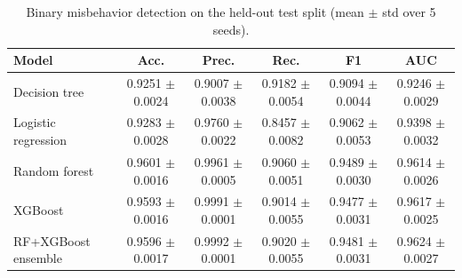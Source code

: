 \begin{table}[!t]
\renewcommand{\arraystretch}{1.15}
\caption{Binary misbehavior detection on the held-out test split (mean $\pm$ std over 5 seeds).}
\label{tab:ids}
\centering
\footnotesize
\setlength{\tabcolsep}{6pt}
\begin{tabular}{@{}lccccc@{}}
\toprule
\textbf{Model} & \textbf{Acc.} & \textbf{Prec.} & \textbf{Rec.} & \textbf{F1} & \textbf{AUC} \\
\midrule
Decision tree & 0.9251 $\pm$ 0.0024 & 0.9007 $\pm$ 0.0038 & 0.9182 $\pm$ 0.0054 & 0.9094 $\pm$ 0.0044 & 0.9246 $\pm$ 0.0029 \\
Logistic regression & 0.9283 $\pm$ 0.0028 & 0.9760 $\pm$ 0.0022 & 0.8457 $\pm$ 0.0082 & 0.9062 $\pm$ 0.0053 & 0.9398 $\pm$ 0.0032 \\
Random forest & 0.9601 $\pm$ 0.0016 & 0.9961 $\pm$ 0.0005 & 0.9060 $\pm$ 0.0051 & 0.9489 $\pm$ 0.0030 & 0.9614 $\pm$ 0.0026 \\
XGBoost & 0.9593 $\pm$ 0.0016 & 0.9991 $\pm$ 0.0001 & 0.9014 $\pm$ 0.0055 & 0.9477 $\pm$ 0.0031 & 0.9617 $\pm$ 0.0025 \\
RF+XGBoost ensemble & 0.9596 $\pm$ 0.0017 & 0.9992 $\pm$ 0.0001 & 0.9020 $\pm$ 0.0055 & 0.9481 $\pm$ 0.0031 & 0.9624 $\pm$ 0.0027 \\
\bottomrule
\end{tabular}
\end{table}
